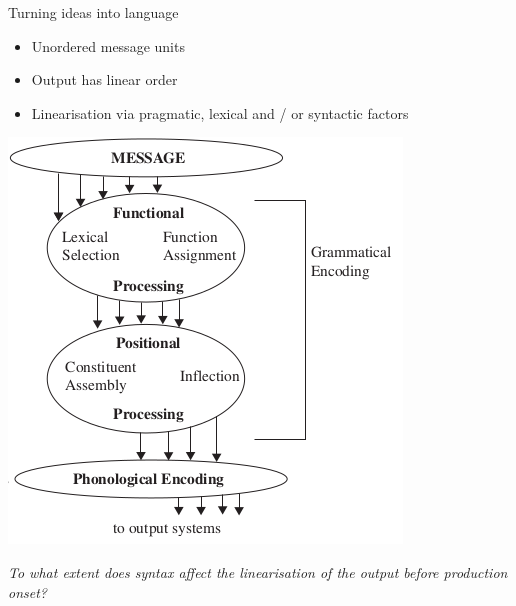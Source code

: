 \begin{frame}{Turning ideas into language \parencite{bock1994}}

\begin{minipage}[t]{.475\textwidth}
\begin{small}
\begin{itemize}
	\item Unordered message units
	\item Output has linear order
	\item Linearisation via pragmatic, lexical and / or syntactic factors 
\end{itemize}
\end{small}
\end{minipage}

\begin{backgroundblock}{60mm}{20mm}	
	\includegraphics[scale=.45]{gfx/BLmodel.png}
\end{backgroundblock}

\end{frame}

\begin{frame}
	\begin{Large}
		\begin{center}
			\textit{To what extent does syntax affect the linearisation of the output before production onset?}
		\end{center}
	\end{Large}
\end{frame}


